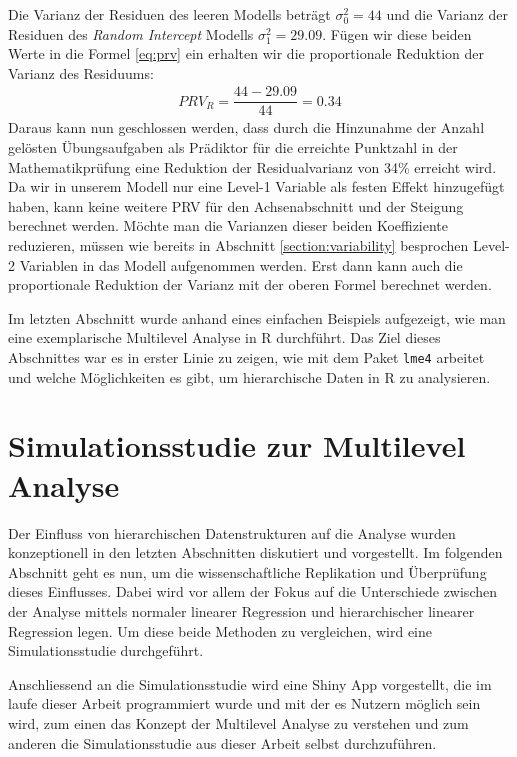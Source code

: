 \documentclass[12pt]{article}\usepackage[]{graphicx}\usepackage[]{color}
\begin{document}

Die Varianz der Residuen des leeren Modells beträgt $\sigma_{0}^2 = 44$ und die Varianz der Residuen des \textit{Random Intercept} Modells $\sigma_{1}^2 = 29.09$. Fügen wir diese beiden Werte in die Formel \eqref{eq:prv} ein erhalten wir die proportionale Reduktion der Varianz des Residuums:
\begin{equation} 
\begin{split}	
 PRV_{R} = \dfrac{44 - 29.09}{44} = 0.34
\end{split}	
\end{equation}
Daraus kann nun geschlossen werden, dass durch die Hinzunahme der Anzahl gelösten Übungsaufgaben als Prädiktor für die erreichte Punktzahl in der Mathematikprüfung eine Reduktion der Residualvarianz von 34\% erreicht wird. Da wir in unserem Modell nur eine Level-1 Variable als festen Effekt hinzugefügt haben, kann keine weitere PRV für den Achsenabschnitt und der Steigung berechnet werden. Möchte man die Varianzen dieser beiden Koeffiziente reduzieren, müssen wie bereits in Abschnitt \ref{section:variability} besprochen Level-2 Variablen in das Modell aufgenommen werden. Erst dann kann auch die proportionale Reduktion der Varianz mit der oberen Formel berechnet werden.

Im letzten Abschnitt wurde anhand eines einfachen Beispiels aufgezeigt, wie man eine exemplarische Multilevel Analyse in R durchführt. Das Ziel dieses Abschnittes war es in erster Linie zu zeigen, wie mit dem Paket \texttt{lme4} arbeitet und welche Möglichkeiten es gibt, um hierarchische Daten in R zu analysieren.

\section{Simulationsstudie zur Multilevel Analyse}
Der Einfluss von hierarchischen Datenstrukturen auf die Analyse wurden konzeptionell in den letzten Abschnitten diskutiert und vorgestellt. Im folgenden Abschnitt geht es nun, um die wissenschaftliche Replikation und Überprüfung dieses Einflusses. Dabei wird vor allem der Fokus auf die Unterschiede zwischen der Analyse mittels normaler linearer Regression und hierarchischer linearer Regression legen. Um diese beide Methoden zu vergleichen, wird eine Simulationsstudie durchgeführt.

Anschliessend an die Simulationsstudie wird eine Shiny App \citep{shiny} vorgestellt, die im laufe dieser Arbeit programmiert wurde und mit der es Nutzern möglich sein wird, zum einen das Konzept der Multilevel Analyse zu verstehen und zum anderen die Simulationsstudie aus dieser Arbeit selbst durchzuführen.
\end{document}

